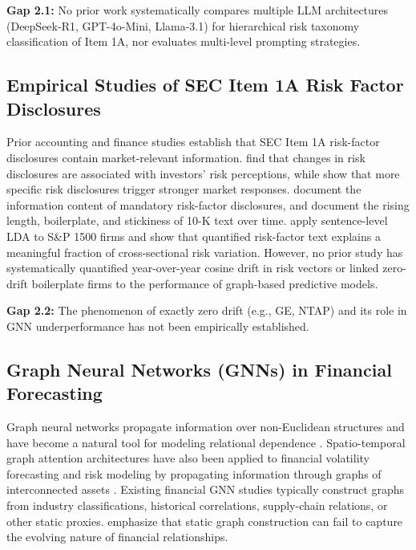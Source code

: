 \documentclass[11pt, a4paper]{article}
\begin{document}
\noindent\textbf{Gap 2.1:} No prior work systematically compares multiple LLM architectures (DeepSeek-R1, GPT-4o-Mini, Llama-3.1) for hierarchical risk taxonomy classification of Item 1A, nor evaluates multi-level prompting strategies.

\subsection{Empirical Studies of SEC Item 1A Risk Factor Disclosures}
Prior accounting and finance studies establish that SEC Item 1A risk-factor disclosures contain market-relevant information. \citet{kravet2013textual} find that changes in risk disclosures are associated with investors' risk perceptions, while \citet{hope2016benefits} show that more specific risk disclosures trigger stronger market responses. \citet{campbell2014information} document the information content of mandatory risk-factor disclosures, and \citet{dyer2017evolution} document the rising length, boilerplate, and stickiness of 10-K text over time. \citet{grundy2021risk} apply sentence-level LDA to S\&P 1500 firms and show that quantified risk-factor text explains a meaningful fraction of cross-sectional risk variation. However, no prior study has systematically quantified year-over-year cosine drift in risk vectors or linked zero-drift boilerplate firms to the performance of graph-based predictive models.

\noindent\textbf{Gap 2.2:} The phenomenon of exactly zero drift (e.g., GE, NTAP) and its role in GNN underperformance has not been empirically established.

\subsection{Graph Neural Networks (GNNs) in Financial Forecasting}
Graph neural networks propagate information over non-Euclidean structures and have become a natural tool for modeling relational dependence \citep{velickovic2018graph}. Spatio-temporal graph attention architectures have also been applied to financial volatility forecasting and risk modeling by propagating information through graphs of interconnected assets \citep{kumar2024temporal}. Existing financial GNN studies typically construct graphs from industry classifications, historical correlations, supply-chain relations, or other static proxies. \citet{niu2024dynamic} emphasize that static graph construction can fail to capture the evolving nature of financial relationships.
\end{document}
